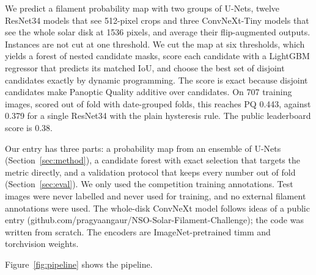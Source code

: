 

We predict a filament probability map with two groups of U-Nets, twelve ResNet34 models that
see 512-pixel crops and three ConvNeXt-Tiny models that see the whole solar disk at 1536 pixels,
and average their flip-augmented outputs. Instances are not cut at one threshold. We cut the map
at six thresholds, which yields a forest of nested candidate masks, score each candidate with a
LightGBM regressor that predicts its matched IoU, and choose the best set of disjoint candidates
exactly by dynamic programming. The score is exact because disjoint candidates make Panoptic
Quality additive over candidates. On 707 training images, scored out of fold with date-grouped
folds, this reaches PQ 0.443, against 0.379 for a single ResNet34 with the plain hysteresis rule.
The public leaderboard score is 0.38.

Our entry has three parts: a probability map from an ensemble of U-Nets
(Section~\ref{sec:method}), a candidate forest with exact selection that targets the metric
directly, and a validation protocol that keeps every number out of fold
(Section~\ref{sec:eval}). We only used the competition training annotations. Test images were
never labelled and never used for training, and no external filament annotations were used.
The whole-disk ConvNeXt model follows ideas of a public entry
(github.com/pragyaangaur/NSO-Solar-Filament-Challenge); the code was written from scratch.
The encoders are ImageNet-pretrained timm and torchvision weights.

\label{sec:method}
Figure~\ref{fig:pipeline} shows the pipeline.


